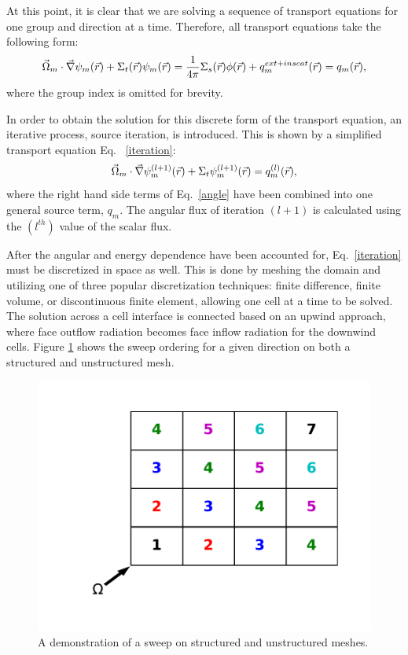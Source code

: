 At this point, it is clear that we are solving a sequence of transport equations for one group and direction at a time. Therefore, all transport equations take the following form:
\begin{equation}
\vec{\Omega}_m \cdot \vec \nabla \psi_{m}(\vec{r}) +\Sigma_{t}(\vec{r}) \psi_{m}(\vec{r})  = \frac{1}{4\pi}\Sigma_{s}(\vec{r})\phi(\vec{r}) + q^{ext+inscat}_m(\vec{r}) = q_m(\vec{r}),
\end{equation}
where the group index is omitted for brevity.

In order to obtain the solution for this discrete form of the transport equation, an iterative process, source iteration, is introduced. This is shown by a simplified transport equation Eq. ~\eqref{iteration}:
\begin{equation}
\vec{\Omega}_m \cdot \vec\nabla \psi_m^{(l+1)}(\vec{r}) + \Sigma_t \psi_m^{(l+1)}(\vec{r}) = q_m^{(l)}(\vec{r}),
\label{iteration}
\end{equation}
where the right hand side terms of Eq.~\eqref{angle} have been combined into one general source term, $q_m$. The angular flux of iteration $(l+1)$ is calculated using the $(l^{th})$ value of the scalar flux.

After the angular and energy dependence have been accounted for, Eq.~\eqref{iteration} must be discretized in space as well. This is done by meshing the domain and utilizing one of three popular discretization techniques: finite difference\cite{fd}, finite volume\cite{fd}, or discontinuous finite element\cite{Reed}, allowing one cell at a time to be solved. The solution across a cell interface is connected based on an upwind approach, where face outflow radiation becomes face inflow radiation for the downwind cells. Figure \ref{sweeps} shows the sweep ordering for a given direction on both a structured and unstructured mesh.

\begin{figure}[H]
\centering
\includegraphics[scale = 0.5]{../figures/StructuredMesh.pdf}
\caption{A demonstration of a sweep on structured and unstructured meshes. }
\label{sweeps}
\end{figure}

